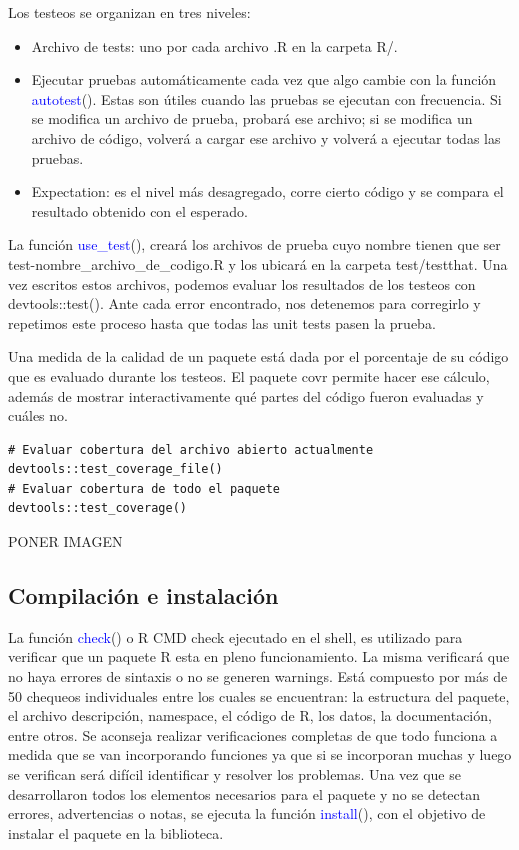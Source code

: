 Los testeos se organizan en tres niveles:
\begin{itemize}
\item Archivo de tests: uno por cada archivo .R en la carpeta R/.
\item Ejecutar pruebas automáticamente cada vez que algo cambie con la función \textcolor{blue}{autotest}(). Estas son útiles cuando las pruebas se ejecutan con frecuencia. Si se modifica un archivo de prueba, probará ese archivo; si se modifica un archivo de código, volverá a cargar ese archivo y volverá a ejecutar todas las pruebas.
\item Expectation: es el nivel más desagregado, corre cierto código y se compara el resultado obtenido con el esperado.
\end{itemize}

La función \textcolor{blue}{use\_test}(), creará los archivos de prueba cuyo nombre tienen que ser test-nombre\_archivo\_de\_codigo.R  y los ubicará en la carpeta test/testthat. Una vez escritos estos archivos, podemos evaluar los resultados de los testeos con devtools::test(). Ante cada error encontrado, nos detenemos para corregirlo y repetimos este proceso hasta que todas las unit tests pasen la prueba.



Una medida de la calidad de un paquete está dada por el porcentaje de su código que es evaluado durante los testeos.
El paquete covr permite hacer ese cálculo, además de mostrar interactivamente qué partes del código fueron evaluadas y cuáles no.

\begin{lstlisting}
# Evaluar cobertura del archivo abierto actualmente
devtools::test_coverage_file()
# Evaluar cobertura de todo el paquete
devtools::test_coverage()
\end{lstlisting}


PONER IMAGEN


\subsection{Compilación e instalación}

La función \textcolor{blue}{check}() o R CMD check ejecutado en el shell, es utilizado para verificar que un paquete R esta en pleno funcionamiento. La misma verificará que no haya errores de sintaxis o no se generen warnings. Está compuesto por más de 50 chequeos individuales entre los cuales se encuentran: la estructura del paquete, el archivo descripción, namespace, el código de R, los datos, la documentación, entre otros. Se aconseja realizar verificaciones completas de que todo funciona a medida que se van incorporando funciones ya que si se incorporan muchas y luego se verifican será difícil identificar y resolver los problemas. Una vez que se desarrollaron todos los elementos necesarios para el paquete y no se detectan errores, advertencias o notas, se ejecuta la función \textcolor{blue}{install}(), con el objetivo de instalar el paquete en la biblioteca.


